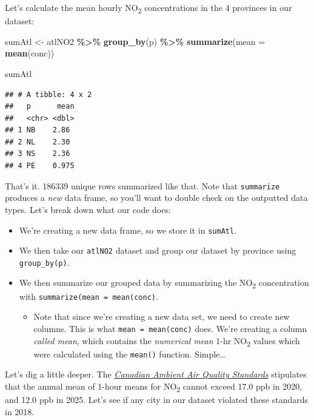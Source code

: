 \documentclass[
]{book}
\newenvironment{Shaded}{\begin{snugshade}}{\end{snugshade}}
\newcommand{\AttributeTok}[1]{\textcolor[rgb]{0.13,0.29,0.53}{#1}}
\newcommand{\FunctionTok}[1]{\textcolor[rgb]{0.13,0.29,0.53}{\textbf{#1}}}
\newcommand{\NormalTok}[1]{#1}
\newcommand{\OtherTok}[1]{\textcolor[rgb]{0.56,0.35,0.01}{#1}}
\newcommand{\SpecialCharTok}[1]{\textcolor[rgb]{0.81,0.36,0.00}{\textbf{#1}}}
\providecommand{\tightlist}{%
  \setlength{\itemsep}{0pt}\setlength{\parskip}{0pt}}
\begin{document}
Let's calculate the mean hourly NO\textsubscript{2} concentrations in the 4 provinces in our dataset:

\begin{Shaded}
\begin{Highlighting}[]
\NormalTok{sumAtl }\OtherTok{\textless{}{-}}\NormalTok{ atlNO2 }\SpecialCharTok{\%\textgreater{}\%}
  \FunctionTok{group\_by}\NormalTok{(p) }\SpecialCharTok{\%\textgreater{}\%}
  \FunctionTok{summarize}\NormalTok{(}\AttributeTok{mean =} \FunctionTok{mean}\NormalTok{(conc))}

\NormalTok{sumAtl}
\end{Highlighting}
\end{Shaded}

\begin{verbatim}
## # A tibble: 4 x 2
##   p      mean
##   <chr> <dbl>
## 1 NB    2.86 
## 2 NL    2.30 
## 3 NS    2.36 
## 4 PE    0.975
\end{verbatim}

That's it. 186339 unique rows summarized like that. Note that \texttt{summarize} produces a \emph{new} data frame, so you'll want to double check on the outputted data types. Let's break down what our code does:

\begin{itemize}
\tightlist
\item
  We're creating a new data frame, so we store it in \texttt{sumAtl}.
\item
  We then take our \texttt{atlNO2} dataset and group our dataset by province using \texttt{group\_by(p)}.
\item
  We then summarize our grouped data by summarizing the NO\textsubscript{2} concentration with \texttt{summarize(mean\ =\ mean(conc)}.

  \begin{itemize}
  \tightlist
  \item
    Note that since we're creating a new data set, we need to create new columns. This is what \texttt{mean\ =\ mean(conc)} does. We're creating a column \emph{called mean}, which contains the \emph{numerical mean} 1-hr NO\textsubscript{2} values which were calculated using the \texttt{mean()} function. Simple\ldots{}
  \end{itemize}
\end{itemize}

Let's dig a little deeper. The \href{https://ccme.ca/en/air-quality-report}{\emph{Canadian Ambient Air Quality Standards}} stipulates that the annual mean of 1-hour means for NO\textsubscript{2} cannot exceed 17.0 ppb in 2020, and 12.0 ppb in 2025. Let's see if any city in our dataset violated these standards in 2018.
\end{document}
